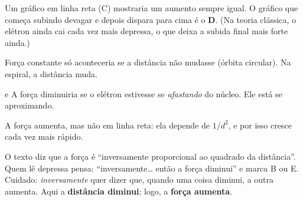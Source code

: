 Um gráfico em linha reta (C) mostraria um aumento sempre igual. O gráfico que começa subindo devagar e depois dispara para
cima é o \textbf{D}. (Na teoria clássica, o elétron ainda cai cada vez mais depressa, o que deixa a subida final mais
forte ainda.)


\begin{outras}
 Força constante só aconteceria se a distância não mudasse (órbita circular). Na espiral, a distância muda.\par
{} e  A força diminuiria se o elétron estivesse se \emph{afastando} do núcleo. Ele está se aproximando.\par
{} A força aumenta, mas não em linha reta: ela depende de $1/d^2$, e por isso cresce cada vez mais rápido.
\end{outras}

\begin{pegadinha}
O texto diz que a força é ``inversamente proporcional ao quadrado da distância''. Quem lê depressa pensa: ``inversamente\ldots{}
então a força diminui'' e marca B ou E. Cuidado: \emph{inversamente} quer dizer que, quando uma coisa diminui, a outra aumenta.
Aqui a \textbf{distância diminui}; logo, a \textbf{força aumenta}.
\end{pegadinha}

